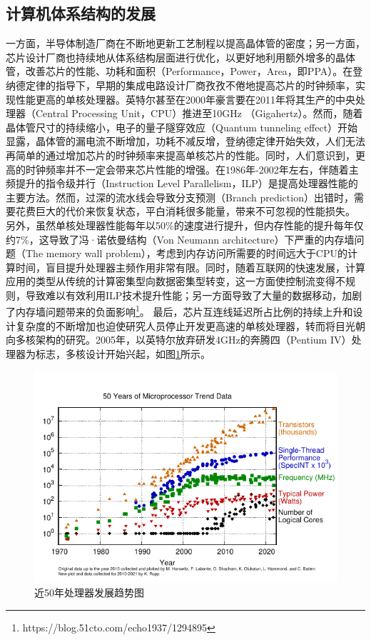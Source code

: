 \subsection{计算机体系结构的发展}

一方面，半导体制造厂商在不断地更新工艺制程以提高晶体管的密度；另一方面，芯片设计厂商也持续地从体系结构层面进行优化，以更好地利用额外增多的晶体管，改善芯片的性能、功耗和面积（Performance，Power，Area，即PPA）。在登纳德定律的指导下，早期的集成电路设计厂商孜孜不倦地提高芯片的时钟频率，实现性能更高的单核处理器。英特尔甚至在2000年豪言要在2011年将其生产的中央处理器（Central Processing Unit，CPU）推进至10GHz （Gigahertz）。然而，随着晶体管尺寸的持续缩小，电子的量子隧穿效应（Quantum tunneling effect）开始显露，晶体管的漏电流不断增加，功耗不减反增，登纳德定律开始失效，人们无法再简单的通过增加芯片的时钟频率来提高单核芯片的性能。同时，人们意识到，更高的时钟频率并不一定会带来芯片性能的增强。在1986年-2002年左右，伴随着主频提升的指令级并行（Instruction Level Parallelism，ILP）是提高处理器性能的主要方法。然而，过深的流水线会导致分支预测（Branch prediction）出错时，需要花费巨大的代价来恢复状态，平白消耗很多能量，带来不可忽视的性能损失\cite{new_golden}。
另外，虽然单核处理器性能每年以50\%的速度进行提升，但内存性能的提升每年仅约7\%，这导致了冯·诺依曼结构（Von Neumann architecture）\cite{von_arch}下严重的内存墙问题（The memory wall problem）\cite{memory_wall}，考虑到内存访问所需要的时间远大于CPU的计算时间，盲目提升处理器主频作用非常有限。同时，随着互联网的快速发展，计算应用的类型从传统的计算密集型向数据密集型转变，这一方面使控制流变得不规则，导致难以有效利用ILP技术提升性能；另一方面导致了大量的数据移动，加剧了内存墙问题带来的负面影响\footnote{https://blog.51cto.com/echo1937/1294895}。
最后，芯片互连线延迟所占比例的持续上升和设计复杂度的不断增加也迫使研究人员停止开发更高速的单核处理器，转而将目光朝向多核架构的研究\cite{free_lauch_over}。2005年，以英特尔放弃研发4GHz的奔腾四（Pentium IV）处理器为标志，多核设计开始兴起\cite{计算机体系结构基础}，如图\ref{50yrs_processor_trend}所示\cite{50yrs_processor_trend}。

\begin{figure}[htb]
    \centering
    \includegraphics[width=\textwidth]{figs/50-years-processor-trend.pdf}
    \caption{近50年处理器发展趋势图}
    \label{50yrs_processor_trend}
\end{figure}

